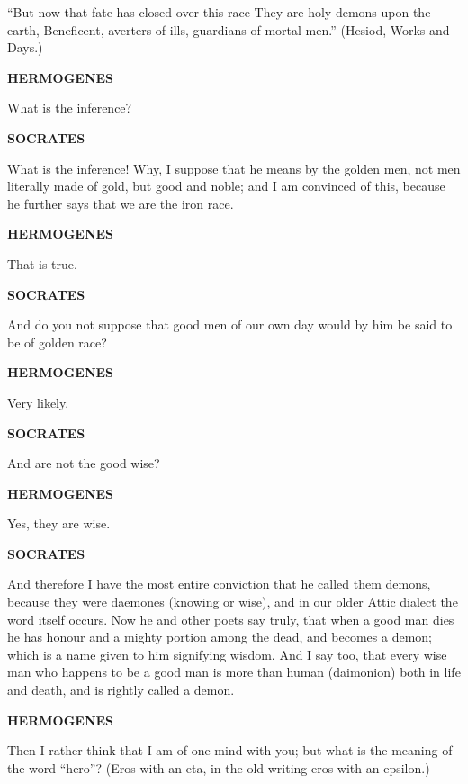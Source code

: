 \documentclass[11pt,letter]{article}
\begin{document}
\par  “But now that fate has closed over this race They are holy demons upon the earth, Beneficent, averters of ills, guardians of mortal men.” (Hesiod, Works and Days.)

\par \textbf{HERMOGENES}
\par   What is the inference?

\par \textbf{SOCRATES}
\par   What is the inference! Why, I suppose that he means by the golden men, not men literally made of gold, but good and noble; and I am convinced of this, because he further says that we are the iron race.

\par \textbf{HERMOGENES}
\par   That is true.

\par \textbf{SOCRATES}
\par   And do you not suppose that good men of our own day would by him be said to be of golden race?

\par \textbf{HERMOGENES}
\par   Very likely.

\par \textbf{SOCRATES}
\par   And are not the good wise?

\par \textbf{HERMOGENES}
\par   Yes, they are wise.

\par \textbf{SOCRATES}
\par   And therefore I have the most entire conviction that he called them demons, because they were daemones (knowing or wise), and in our older Attic dialect the word itself occurs. Now he and other poets say truly, that when a good man dies he has honour and a mighty portion among the dead, and becomes a demon; which is a name given to him signifying wisdom. And I say too, that every wise man who happens to be a good man is more than human (daimonion) both in life and death, and is rightly called a demon.

\par \textbf{HERMOGENES}
\par   Then I rather think that I am of one mind with you; but what is the meaning of the word “hero”? (Eros with an eta, in the old writing eros with an epsilon.)
\end{document}
